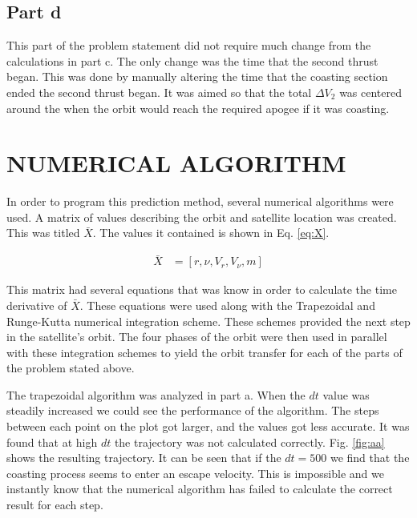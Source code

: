 \documentclass[cleanfoot,cleanhead,onecolumn,10pt,notitlepage]{asme2e}
\begin{document}
\subsection{Part d}

This part of the problem statement did not require much change from the calculations in part c.  The only change was the time that the second thrust began.  This was done by manually altering the time that the coasting section ended the second thrust began.  It was aimed so that the total $\Delta V_2$ was centered around the when the orbit would reach the required apogee if it was coasting.  



\section{NUMERICAL ALGORITHM}

In order to program this prediction method, several numerical algorithms were used.  A matrix of values describing the orbit and satellite location was created.  This was titled $\bar{X}$.  The values it contained is shown in Eq. \ref{eq:X}.  

\begin{equation}
\begin{aligned}
\bar{X} &= \left[r, \nu, V_r, V_\nu, m\right]
\label{eq:X}
\end{aligned}
\end{equation}

This matrix had several equations that was know in order to calculate the time derivative of $\bar{X}$.  These equations were used along with the Trapezoidal and Runge-Kutta numerical integration scheme.  These schemes provided the next step in the satellite's orbit.  The four phases of the orbit were then used in parallel with these integration schemes to yield the orbit transfer for each of the parts of the problem stated above.  

The trapezoidal algorithm was analyzed in part a.  When the $dt$ value was steadily increased we could see the performance of the algorithm.  The steps between each point on the plot got larger, and the values got less accurate.  It was found that at high $dt$ the trajectory was not calculated correctly.  Fig. \ref{fig:aa} shows the resulting trajectory.  It can be seen that if the $dt = 500$ we find that the coasting process seems to enter an escape velocity.  This is impossible and we instantly know that the numerical algorithm has failed to calculate the correct result for each step.
\end{document}
